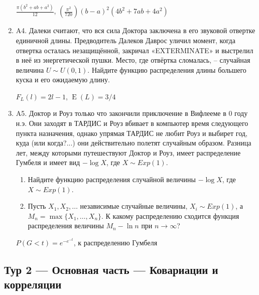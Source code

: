 \documentclass[12pt]{article}
\DeclareMathOperator{\E}{E}
\def \P{P}
\newenvironment{problem}{}{}
\newenvironment{sol}{}{} %
\begin{document}
\begin{enumerate}
\begin{problem}
\begin{sol}
$\frac{\pi(b^2 + ab + a^2)}{12}$, $\left(\frac{\pi^2}{720}\right) (b-a)^2 (4b^2 +7ab + 4a^2)$
\end{sol}
\end{problem}

\begin{problem}
\item[A4.] Далеки считают, что вся сила Доктора заключена в его звуковой отвертке единичной длины. Предводитель Далеков Даврос уличил момент, когда отвертка осталась незащищённой, закричал 
\newline
«EXTERMINATE» и выстрелил в неё из энергетической пушки. Место, где отвёртка сломалась, – случайная величина $U \sim U(0,1)$. Найдите функцию распределения длины большего куска и его ожидаемую длину.

\begin{sol}
$F_L(l) = 2l-1$, $\E(L) = 3/4$
\end{sol}
\end{problem}

\begin{problem}
\item[A5.] 
Доктор и Роуз только что закончили приключение в Вифлееме в 0 году н.э. Они заходят в ТАРДИС и Роуз вбивает в компьютер время следующего пункта назначения, однако упрямая ТАРДИС не любит Роуз и выбирет год, куда (или когда?...) они действительно полетят случайным образом. Разница лет, между которыми путешествуют Доктор и Роуз, имеет распределение Гумбеля и имеет вид $-\log X$, где $X \sim Exp(1)$. 
\begin{enumerate}
\item Найдите функцию распределения случайной величины $-\log X$, где $X \sim Exp(1)$. 
\item Пусть $X_1, X_2, \ldots $ независимые случайные величины, $X_i \sim Exp(1)$, а $M_n = \max\{X_1, \ldots, X_n\}$. К какому распределению сходится функция распределения величины $M_n - \ln n$ при $n \to \infty$?
\end{enumerate}

\begin{sol}
$\P(G < t) =e^{-e^{-t}}$, к распределению Гумбеля
\end{sol}
\end{problem}
\end{enumerate}

\newpage
\subsection{Тур 2 — Основная часть — Ковариации и корреляции}
\end{document}
